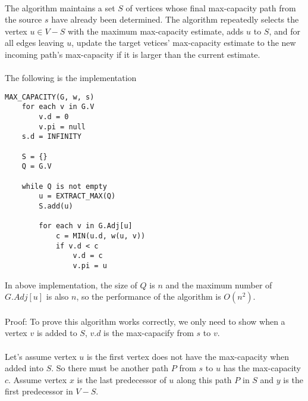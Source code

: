 \documentclass{article}
\begin{document}
\vspace{20px}

\paragraph{}

The algorithm maintains a set $S$ of vertices whose final max-capacity path from the source $s$ have already been determined. The algorithm repeatedly selects the vertex $u \in V-S$ with the maximum max-capacity estimate, adds $u$ to $S$, and for all edges leaving $u$, update the target vetices' max-capacity estimate to the new incoming path's max-capacity if it is larger than the current estimate.


\paragraph{}
The following is the implementation

\begin{verbatim}
MAX_CAPACITY(G, w, s)
    for each v in G.V
        v.d = 0
        v.pi = null
    s.d = INFINITY

    S = {}
    Q = G.V

    while Q is not empty
        u = EXTRACT_MAX(Q)
        S.add(u)

        for each v in G.Adj[u]
            c = MIN(u.d, w(u, v))
            if v.d < c
                v.d = c
                v.pi = u
\end{verbatim}

In above implementation, the size of $Q$ is $n$ and the maximum number of $G.Adj[u]$ is also $n$, so the performance of the algorithm is $O(n^2)$.

\paragraph{}
Proof: To prove this algorithm works correctly, we only need to show when a vertex $v$ is added to $S$, $v.d$ is the max-capacify from $s$ to $v$.

\paragraph{}
Let's assume vertex $u$ is the first vertex does not have the max-capacity when added into $S$. So there must be another path $P$ from $s$ to $u$ has the max-capacity $c$. Assume vertex $x$ is the last predecessor of $u$ along this path $P$ in $S$ and $y$ is the first predecessor in $V-S$.
\end{document}
